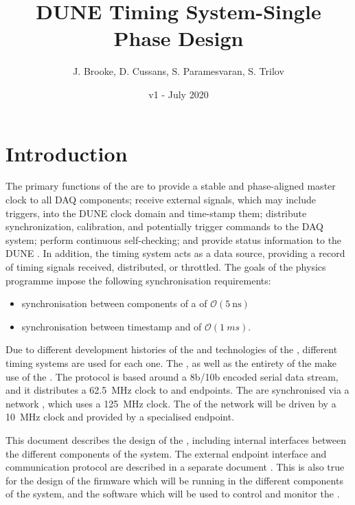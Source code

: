 \documentclass{dune}
\title{DUNE Timing System-Single Phase Design}
\author{J. Brooke, D. Cussans, S. Paramesvaran, S. Trilov}
\date{v1 - July 2020}
\begin{document}
\linenumbers
\maketitle

\tableofcontents

\section{Introduction}
\label{sec:intro}
The primary functions of the  are to provide a stable and phase-aligned master clock to all DAQ components; receive external signals, which may include triggers, into the DUNE clock domain and time-stamp them; distribute synchronization, calibration, and potentially trigger commands to the DAQ system; perform continuous self-checking; and provide status information to the DUNE . In addition, the timing system acts as a data source, providing a record of timing signals received, distributed, or throttled. The goals of the  physics programme impose the following synchronisation requirements:

\begin{itemize}
    \item synchronisation between components of a  of $\mathcal{O}(\SI{5}{\ns})$
    \item synchronisation between  timestamp and  of $\mathcal{O}(\SI{1}{ms})$.
\end{itemize}

Due to different development histories of the  and  technologies of the  , different timing systems are used for each one. The  , as well as the entirety of the   make use of the . The protocol is based around a 8b/10b encoded serial data stream, and it distributes a \SI{62.5}{\MHz} clock to  and   endpoints. The   are synchronised via a  network \cite{wr_ohwr}, which uses a \SI{125}{\MHz} clock. The  of the    network will be driven by a \SI{10}{\MHz} clock and  provided by a specialised  endpoint.

This document describes the design of the , including internal interfaces between the different components of the system. The external endpoint interface and  communication protocol are described in a separate document \cite{dts_sp_protocol}. This is also true for the design of the firmware which will be running in the different components of the system, and the software which will be used to control and monitor the  \cite{dts_sp_firmware}  \cite{dts_sp_software}.
\end{document}
